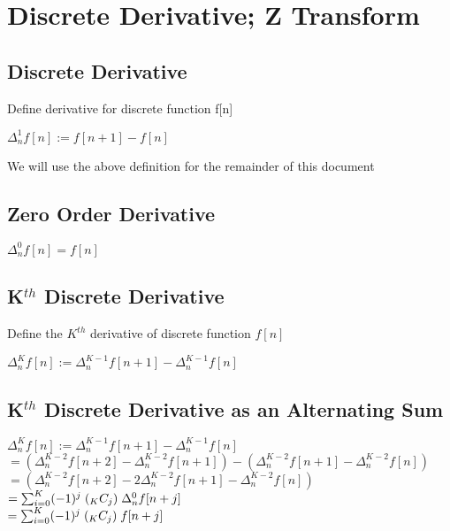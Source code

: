 \documentclass[11pt]{article}
\begin{document}
\section{Discrete Derivative; Z Transform}
\subsection{Discrete Derivative}
Define derivative for discrete function f[n]
\begin{center}
\vspace{1mm}
$
\Delta_n^1 f[n] := f[n+1] - f[n]
$
\end{center}
\vspace{1mm}
We will use the above definition for the remainder of this document \\


\subsection{Zero Order Derivative}
\begin{center}
\vspace{1mm}
$
\Delta_n^0 f[n] = f[n]
$
\end{center}




\subsection{K$^{th}$ Discrete Derivative}
Define the $K^{th}$ derivative of discrete function $f[n]$
\begin{center}
\vspace{1mm}
$
\Delta_n^K f[n] := \Delta_n^{K-1} f[n+1] - \Delta_n^{K-1} f[n]
$
\end{center}




\subsection{K$^{th}$ Discrete Derivative as an Alternating Sum}
\begin{center}
$
\Delta_n^K f[n] := \Delta_n^{K-1} f[n+1] - \Delta_n^{K-1} f[n]
$
\\ \vspace{4mm}
$
= (\Delta_n^{K-2} f[n+2] - \Delta_n^{K-2} f[n+1]) - (\Delta_n^{K-2} f[n+1] - \Delta_n^{K-2} f[n])
$
\\ \vspace{4mm}
$
= (\Delta_n^{K-2} f[n+2] - 2\Delta_n^{K-2} f[n+1] - \Delta_n^{K-2} f[n])
$
\\ \vspace{4mm}
$
=  \sum_{i=0}^K (-1)^{j} \hspace{1mm} (_K C _j) \hspace{1mm} \Delta_n^{0} f[n + j]
$
\\ \vspace{4mm}
$
= \sum_{i=0}^K (-1)^{j} \hspace{1mm} (_K C _j) \hspace{1mm} f[n + j]
$
\end{center}
\end{document}
